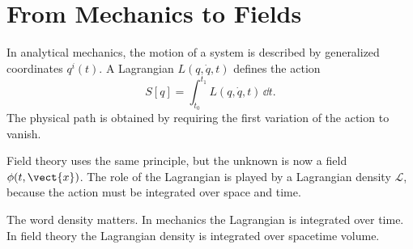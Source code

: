 \section{From Mechanics to Fields}

In analytical mechanics, the motion of a system is described by generalized
coordinates \(q^i(t)\). A Lagrangian \(L(q,\dot{q},t)\) defines the action
\[
    S[q]=\int_{t_0}^{t_1} L(q,\dot{q},t)\,\dd t.
\]
The physical path is obtained by requiring the first variation of the action to
vanish.

Field theory uses the same principle, but the unknown is now a field
\(\phi(t,\vect{x})\). The role of the Lagrangian is played by a Lagrangian
density \(\mathcal{L}\), because the action must be integrated over space and
time.

\begin{remarkbox}
The word density matters. In mechanics the Lagrangian is integrated over time.
In field theory the Lagrangian density is integrated over spacetime volume.
\end{remarkbox}
